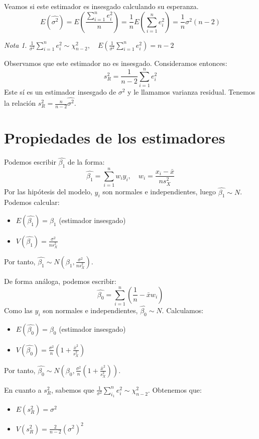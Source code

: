 \documentclass{report}
\theoremstyle{remark}
\theoremstyle{remark}
\newtheorem*{note}{Nota}
\theoremstyle{remark}
\theoremstyle{definition}
\theoremstyle{definition}
\theoremstyle{definition}
\begin{document}
Veamos si este estimador es insesgado calculando su esperanza.
$$E(\hat{\sigma^2}) = E(\frac{\sum_{i=1}^n e_i^2}{n}) = \frac{1}{n}E(\sum_{i=1}^n e_i^2) = \frac{1}{n}\sigma^2(n-2)$$

\begin{note}
    $\frac{1}{\sigma^2} \sum_{i=1}^n e_i^2 \sim \chi^2_{n-2}, \quad E(\frac{1}{\sigma^2} \sum_{i=1}^n e_i^2) = n-2$
\end{note}

Observamos que este estimador no es insesgado. Consideramos entonces:
$$s_R^2 = \frac{1}{n-2}\sum_{i=1}^n e_i^2$$
Este sí es un estimador insesgado de $\sigma^2$ y le llamamos varianza residual.
Tenemos la relación $s_R^2 = \frac{n}{n-2} \hat{\sigma^2}$.

\section{Propiedades de los estimadores}
Podemos escribir $\hat{\beta_1}$ de la forma:
$$\hat{\beta_1} = \sum_{i=1}^n w_iy_i, \quad w_i = \frac{x_i - \bar{x}}{ns_X^2}$$
Por las hipótesis del modelo, $y_i$ son normales e independientes, luego $\hat{\beta_1} \sim N$.
Podemos calcular:

\begin{itemize}
    \item $E(\hat{\beta_1}) = \beta_1$ (estimador insesgado)
    \item $V(\hat{\beta_1}) = \frac{\sigma^2}{ns_X^2}$
\end{itemize}
Por tanto, $\hat{\beta_1} \sim N(\beta_1, \frac{\sigma^2}{ns_X^2})$.

De forma análoga, podemos escribir:
$$\hat{\beta_0} = \sum_{i=1}^n (\frac{1}{n} - \bar{x}w_i)$$
Como las $y_i$ son normales e independientes, $\hat{\beta_0} \sim N$.
Calculamos:

\begin{itemize}
    \item $E(\hat{\beta_0}) = \beta_0$ (estimador insesgado)
    \item $V(\hat{\beta_0}) = \frac{\sigma^2}{n} (1 + \frac{\bar{x}^2}{s_X^2})$
\end{itemize}
Por tanto, $\hat{\beta_0} \sim N(\beta_0, \frac{\sigma^2}{n} (1 + \frac{\bar{x}^2}{s_X^2}))$.

En cuanto a $s_R^2$, sabemos que $\frac{1}{\sigma^2} \sum_{i_1}^n e_i^2 \sim \chi^2_{n-2}$.
Obtenemos que:
\begin{itemize}
    \item $E(s_R^2) = \sigma^2$
    \item $V(s_R^2) = \frac{2}{n-2} (\sigma^2)^2$
\end{itemize}
\end{document}
